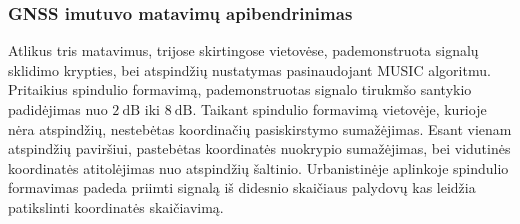 \documentclass[main.tex]{subfiles}
\begin{document}
\subsubsection{GNSS imutuvo matavimų apibendrinimas}


Atlikus tris matavimus, trijose skirtingose vietovėse, pademonstruota signalų
sklidimo kryp\-ties, bei atspindžių nustatymas pasinaudojant MUSIC algoritmu.
Pritaikius spindulio formavimą, pademonstruotas signalo tirukmšo santykio padidėjimas nuo
$2\ \mathrm{dB}$ iki $8\ \mathrm{dB}$. Taikant spindulio formavimą
vietovėje, kurioje nėra atspindžių, nestebėtas koordinačių pasiskirstymo
sumažėjimas. Esant vienam atspindžių paviršiui, pastebėtas koordinatės 
nuokrypio sumažėjimas, bei vidutinės koordinatės atitolėjimas nuo atspindžių
šaltinio. Urbanistinėje aplinkoje spindulio formavimas padeda priimti
signalą iš didesnio skaičiaus palydovų kas leidžia patikslinti
koordinatės skai\-čia\-vi\-mą.
\end{document}
